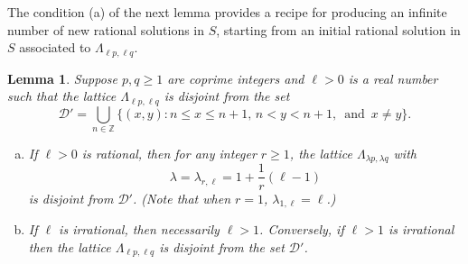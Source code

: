 \documentclass[11pt, letterpaper, reqno]{amsart}
\newtheorem{lem}[thm]{Lemma}
\theoremstyle{definition}
\theoremstyle{remark}
\numberwithin{equation}{section}
\newcommand{\ZZ}{\ensuremath{\mathbb{Z}}}
\newcommand{\cDprime}{{\mathcal{D}'}}
\begin{document}
 
 The condition (a) of the next lemma provides a recipe for producing an infinite number of new rational solutions
 in $S$,
 starting from an initial rational  solution in $S$ associated to  $\Lambda_{\ell p,\ell q}$.
\begin{lem}
\label{lem:hyperbola-neg-sporadic}
Suppose $p,q\geq 1$ are coprime integers and 
$\ell>0$ is a real number  such that 
the lattice $\Lambda_{\ell p,\ell q}$ is disjoint from the set
\[  \cDprime = \bigcup_{n\in\ZZ} 
    \{ (x,y) : n\leq x \leq n+1, \, n < y < n+1, \,\text{ and }\, x\neq y\}. \]
\begin{enumerate}[(a)]
\item[(a)]
If $\ell > 0$ is rational,
then for any integer $r \geq 1$, the lattice $\Lambda_{\lambda p,\lambda q}$ with
\[ 
\lambda = \lambda_{r,\ell} = 1 + \frac1{r}\left(\ell - 1\right) 
\]
is disjoint from $\cDprime$.
(Note that when $r = 1$, $\lambda_{1,\ell} = \ell$.)

\item[(b)]
If $\ell$ is irrational,
then necessarily $\ell > 1$.
Conversely, if $\ell > 1$ is irrational then
the lattice $\Lambda_{\ell p,\ell q}$ is  disjoint from the set
$\cDprime$.

\end{enumerate}
\end{lem}
\end{document}
